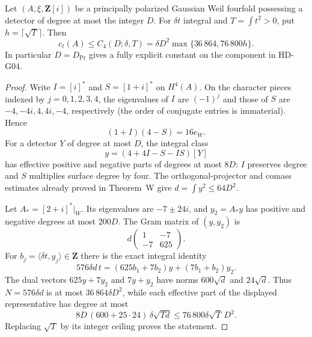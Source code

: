 \begin{theorem}
\label{HD-G05}
Let $(A,\xi,\mathbf Z[i])$ be a principally polarized Gaussian Weil
fourfold possessing a detector of degree at most the integer $D$.
For $\delta t$ integral and $T=\int t^2>0$, put $h=\lceil\sqrt T\rceil$.
Then
\[
 c_t(A)\le C_4(D;\delta,T)
 =\delta D^2\max\{36\,864,76\,800h\}.
\]
In particular $D=D_{\mathrm{Pr}}$ gives a fully explicit constant on
the component in HD-G04.
\end{theorem}
\begin{proof}
Write $I=[i]^*$ and $S=[1+i]^*$ on $H^4(A)$.
On the character pieces indexed by $j=0,1,2,3,4$, the eigenvalues
of $I$ are $(-1)^j$ and those of $S$ are
$-4,-4i,4,4i,-4$, respectively (the order of conjugate entries is
immaterial). Hence
\[
 (1+I)(4-S)=16e_W.
\]
For a detector $Y$ of degree at most $D$, the integral class
\[
 y=(4+4I-S-IS)[Y]
\]
has effective positive and negative parts of degrees at most $8D$:
$I$ preserves degree and $S$ multiplies surface degree by four.
The orthogonal-projector and comass estimates already proved in
Theorem~W give $d=\int y^2\le64D^2$.

Let $A_*= [2+i]^*|_W$. Its eigenvalues are $-7\pm24i$, and
$y_2=A_*y$ has positive and negative degrees at most $200D$.
The Gram matrix of $(y,y_2)$ is
\[
 d\begin{pmatrix}1&-7\\-7&625\end{pmatrix}.
\]
For $b_j=\langle\delta t,y_j\rangle\in\mathbf Z$ there is the exact
integral identity
\[
 576\delta d\,t=(625b_1+7b_2)y+(7b_1+b_2)y_2.
\]
The dual vectors $625y+7y_2$ and $7y+y_2$ have norms
$600\sqrt d$ and $24\sqrt d$. Thus $N=576\delta d$ is at most
$36\,864\delta D^2$, while each effective part of the displayed
representative has degree at most
\[
 8D\,(600+25\cdot24)\,\delta\sqrt{Td}
 \le76\,800\delta\sqrt T\,D^2.
\]
Replacing $\sqrt T$ by its integer ceiling proves the statement.
\end{proof}
